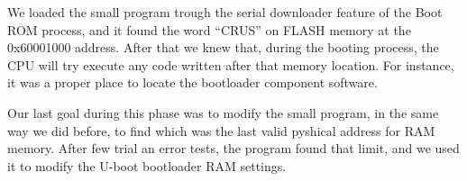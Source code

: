 \documentclass[conference]{IEEEtran}
\newcommand{\nota}[1]{}
\begin{document}
\nota{Para lograr el cometido, enviamos nuestro programa en los 2048 bytes
que el sistema lee desde el arranque vía ``download en serie''.
Nuestro programa leyó bytes
de direcciones consecutivas, comenzando en la dirección 0x60000000 (que
tomamos como referencia del manual de Cirrus).
Encontramos la dirección base de la memoria FLASH en 
la dirección 0x60001000, ya que el programa leyó la palabra ``CRUS''
en cuatro bytes consecutivos. Esos cuatro bytes ``CRUS'' indican el inicio
del software de arranque, ya que está especificado en el manual
de la programación del SOC.}

We loaded the small program trough the serial downloader feature of 
the Boot ROM process, and it found the word ``CRUS'' on 
FLASH memory at the 0x60001000 address. After that we knew that, during 
the booting process, the CPU will try execute any code written 
after that memory location. For instance, it was a proper place 
to locate the bootloader component software.

\nota{De una manera similar, tuvimos acceso al conocimiento de
las direcciones físicas de la memoria RAM.}

Our last goal during this phase was to modify the small program, in 
the same way we did before, to find which was the last valid pyshical 
address for RAM memory. After few trial an error tests, the program 
found that limit, and we used it to modify the U-boot bootloader RAM 
settings.
\end{document}

